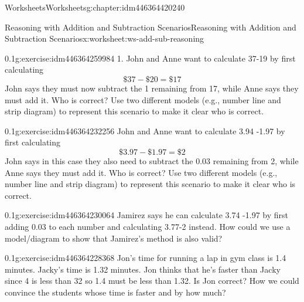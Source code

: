 \documentclass[twoside,11pt,]{book}
\begin{document}
\begin{chapterptx}{Worksheets}{}{Worksheets}{}{}{g:chapter:idm446364420240}
%
%
\typeout{************************************************}
\typeout{************************************************}
%
\begin{worksheet-section-numberless}{Reasoning with Addition and Subtraction Scenarios}{}{Reasoning with Addition and Subtraction Scenarios}{}{}{x:worksheet:ws-add-sub-reasoning}
\begin{divisionexercise}{1}{}{0.1}{g:exercise:idm446364259984}%
1.	John and Anne want to calculate \textdollar{}37-\textdollar{}19 by first calculating%
\begin{equation*}
\$37-\$20=\$17 
\end{equation*}
John says they must now subtract the \textdollar{}1 remaining from \textdollar{}17, while Anne says they must add it.  Who is correct?  Use two different models (e.g., number line and strip diagram) to represent this scenario to make it clear who is correct.%
\end{divisionexercise}%
\begin{divisionexercise}{2}{}{0.1}{g:exercise:idm446364232256}%
John and Anne want to calculate \textdollar{}3.94 -\textdollar{}1.97 by first calculating%
\begin{equation*}
\$3.97-\$1.97 = \$2 
\end{equation*}
John says in this case they also need to subtract the \textdollar{}0.03 remaining from \textdollar{}2, while Anne says they must add it.  Who is correct?  Use two different models (e.g., number line and strip diagram) to represent this scenario to make it clear who is correct.%
\end{divisionexercise}%
\begin{divisionexercise}{3}{}{0.1}{g:exercise:idm446364230064}%
Jamirez says he can calculate \textdollar{}3.74 -\textdollar{}1.97 by first adding \textdollar{}0.03 to each number and calculating \textdollar{}3.77-\textdollar{}2 instead.  How could we use a model\slash{}diagram to show that Jamirez’s method is also valid?%
\end{divisionexercise}%
\begin{divisionexercise}{4}{}{0.1}{g:exercise:idm446364228368}%
Jon’s time for running a lap in gym class is 1.4 minutes.  Jacky’s time is 1.32 minutes.  Jon thinks that he’s faster than Jacky since 4 is less than 32 so 1.4 must be less than 1.32.  Is Jon correct?  How we could convince the students whose time is faster and by how much?%

\end{divisionexercise}
\end{worksheet-section-numberless}
\end{chapterptx}
\end{document}
